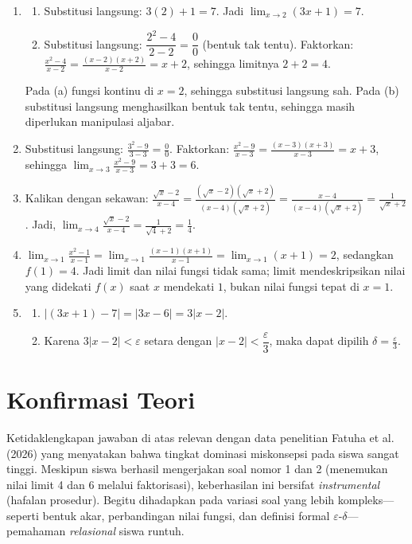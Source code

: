 \documentclass[12pt,a4paper,openany]{book}
\theoremstyle{definition}
\begin{document}
\begin{enumerate}[label=\textbf{\arabic*.}]
    \item 
    \begin{enumerate}[label=(\alph*)]
        \item Substitusi langsung: \(3(2)+1=7\). Jadi \(\displaystyle \lim_{x\to2}(3x+1)=7\).
        \item Substitusi langsung: \(\dfrac{2^2-4}{2-2}=\dfrac{0}{0}\) (bentuk tak tentu). Faktorkan: \(\frac{x^2-4}{x-2}=\frac{(x-2)(x+2)}{x-2}=x+2\), sehingga limitnya \(2+2=4\).
    \end{enumerate}
    Pada (a) fungsi kontinu di \(x=2\), sehingga substitusi langsung sah. Pada (b) substitusi langsung menghasilkan bentuk tak tentu, sehingga masih diperlukan manipulasi aljabar.

    \item Substitusi langsung: \(\frac{3^2-9}{3-3}=\frac{0}{0}\). Faktorkan: \(\frac{x^2-9}{x-3}=\frac{(x-3)(x+3)}{x-3}=x+3\), sehingga \(\lim_{x\to3}\frac{x^2-9}{x-3}=3+3=6\).

    \item Kalikan dengan sekawan: \(\frac{\sqrt{x}-2}{x-4}=\frac{(\sqrt{x}-2)(\sqrt{x}+2)}{(x-4)(\sqrt{x}+2)}=\frac{x-4}{(x-4)(\sqrt{x}+2)}=\frac{1}{\sqrt{x}+2}\). Jadi, \(\lim_{x\to4}\frac{\sqrt{x}-2}{x-4}=\frac{1}{\sqrt{4}+2}=\frac{1}{4}\).

    \item \(\lim_{x\to1}\frac{x^2-1}{x-1}=\lim_{x\to1}\frac{(x-1)(x+1)}{x-1}=\lim_{x\to1}(x+1)=2\), sedangkan \(f(1)=4\). Jadi limit dan nilai fungsi tidak sama; limit mendeskripsikan nilai yang didekati \(f(x)\) saat \(x\) mendekati \(1\), bukan nilai fungsi tepat di \(x=1\).

    \item 
    \begin{enumerate}[label=(\alph*)]
        \item \(|(3x+1)-7|=|3x-6|=3|x-2|\).
        \item Karena \(3|x-2|<\varepsilon\) setara dengan \(|x-2|<\dfrac{\varepsilon}{3}\), maka dapat dipilih \(\delta=\frac{\varepsilon}{3}\).
    \end{enumerate}
\end{enumerate}

\section{Konfirmasi Teori}

Ketidaklengkapan jawaban di atas relevan dengan data penelitian Fatuha et al. (2026) yang menyatakan bahwa tingkat dominasi miskonsepsi pada siswa sangat tinggi. Meskipun siswa berhasil mengerjakan soal nomor 1 dan 2 (menemukan nilai limit 4 dan 6 melalui faktorisasi), keberhasilan ini bersifat \textit{instrumental} (hafalan prosedur). Begitu dihadapkan pada variasi soal yang lebih kompleks---seperti bentuk akar, perbandingan nilai fungsi, dan definisi formal $\varepsilon$-$\delta$---pemahaman \textit{relasional} siswa runtuh.
\end{document}
